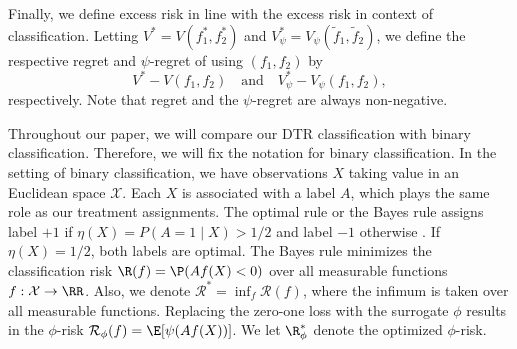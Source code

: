 \documentclass[preprint] {imsart}
\begin{document}
Finally, we define excess risk in line with the excess risk in context of classification. 
Letting $V^{*}=V(f_1^*,f_2^*)$
and $V^{*}_\psi=V_{\psi}(\tilde f_1,\tilde f_2)$,  
we define the respective regret and  $\psi$-regret of using $(f_1,f_2)$ by
\[V^{*}-V(f_1,f_2)\quad\text{and}\quad V^{*}_{\psi}-V_{\psi}(f_1,f_2),\]
respectively.
 Note that regret and the  $\psi$-regret are always non-negative. 
 
Throughout our paper, we will compare our DTR  classification with binary classification. Therefore, we  will fix the notation for  binary classification.
In the setting of binary classification, we have observations $X$ taking value in an Euclidean space $\mathcal X$. Each  $X$ is associated with  a label $A$, which plays the same role as our treatment assignments. The optimal rule or the  Bayes rule  assigns label $+1$ if $\eta(X)=P(A=1\mid X)>1/2$ and label $-1$ otherwise \citep[cf.][]{bartlett2006}. If $\eta(X)=1/2$, both labels are optimal.  The Bayes rule minimizes the classification risk $\R(f)=\P(Af(X)<0)$ over all measurable functions $f:\mathcal X\to\RR$. Also, we denote $\mathcal R^*=\inf_f \mathcal R(f)$, where the infimum is taken over all measurable functions.
Replacing the zero-one loss with the  surrogate $\phi$  results in the  $\phi$-risk
$\mathcal R_{\phi}(f)=\E[ \psi(Af(X))]$. We let $\R_{\phi}^{*}$ denote the optimized $\phi$-risk.


   
\end{document}
